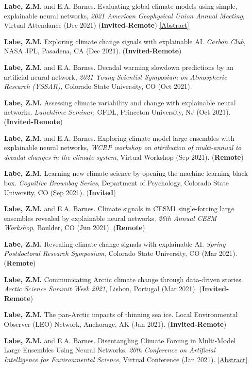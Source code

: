 \documentclass[margin,line,palatino,courier,10pt]{res}
\begin{document}
\begin{resume}
\begin{etaremune}[leftmargin=0in,topsep=0in,parsep=0in]
\item \textbf{Labe, Z.M.} and E.A. Barnes. Evaluating global climate models using simple, explainable neural networks, \textit{2021 American Geophysical Union Annual Meeting}, Virtual Attendance (Dec 2021) (\textbf{Invited-Remote}) \href{https://agu.confex.com/agu/fm21/meetingapp.cgi/Paper/797879}{[Abstract]}
\item \textbf{Labe, Z.M.} Exploring climate change signals with explainable AI. \textit{Carbon Club}, NASA JPL, Pasadena, CA (Dec 2021). (\textbf{Invited-Remote})
\item \textbf{Labe, Z.M.} and E.A. Barnes. Decadal warming slowdown predictions by an artificial neural network, \textit{2021 Young Scientist Symposium on Atmospheric Research (YSSAR)}, Colorado State University, CO (Oct 2021).
\item \textbf{Labe, Z.M.} Assessing climate variability and change with explainable neural networks. \textit{Lunchtime Seminar}, GFDL, Princeton University, NJ (Oct 2021). (\textbf{Invited-Remote})
\item \textbf{Labe, Z.M.} and E.A. Barnes. Exploring climate model large ensembles with explainable neural networks, \textit{WCRP workshop on attribution of multi-annual to decadal changes in the climate system}, Virtual Workshop (Sep 2021). (\textbf{Remote})
\item \textbf{Labe, Z.M.} Learning new climate science by opening the machine learning black box. \textit{Cognitive Brownbag Series}, Department of Psychology, Colorado State University, CO (Sep 2021). (\textbf{Invited})
\item \textbf{Labe, Z.M.} and E.A. Barnes. Climate signals in CESM1 single-forcing large ensembles revealed by explainable neural networks, \textit{26th Annual CESM Workshop}, Boulder, CO (Jun 2021). (\textbf{Remote})
\item \textbf{Labe, Z.M.} Revealing climate change signals with explainable AI. \textit{Spring Postdoctoral Research Symposium}, Colorado State University, CO (Mar 2021). (\textbf{Remote})
\item \textbf{Labe, Z.M.} Communicating Arctic climate change through data-driven stories. \textit{Arctic Science Summit Week 2021}, Lisbon, Portugal (Mar 2021). (\textbf{Invited-Remote})
\item \textbf{Labe, Z.M.} The pan-Arctic impacts of thinning sea ice. Local Environmental Observer (LEO) Network, Anchorage, AK (Jan 2021). (\textbf{Invited-Remote})
\item \textbf{Labe, Z.M.} and E.A. Barnes. Disentangling Climate Forcing in Multi-Model Large Ensembles Using Neural Networks. \textit{20th Conference on Artificial Intelligence for Environmental Science}, Virtual Conference (Jan 2021). \href{https://ams.confex.com/ams/101ANNUAL/meetingapp.cgi/Paper/379553}{[Abstract]}

\end{etaremune}
\end{resume}
\end{document}
